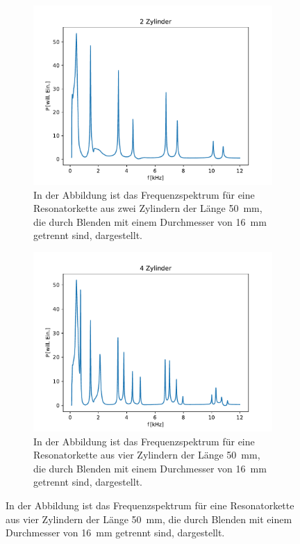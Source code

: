             \FloatBarrier
            \begin{figure}[ht]
                \centering
                \begin{subfigure}[b]{0.45\textwidth}
                    \centering
                    \includegraphics[scale=0.45]{./pictures/1dim_2_Zylinder_16mm.pdf}
                    \caption{In der Abbildung ist das Frequenzspektrum für eine Resonatorkette aus zwei Zylindern der Länge \SI{50}{\milli\metre}, die durch Blenden mit einem Durchmesser von \SI{16}{\milli\metre} getrennt sind, dargestellt.}
                    \label{fig:1dim_2_Zylinder_16mm}
                \end{subfigure}
                \hfill
                \centering
                \begin{subfigure}[b]{0.45\textwidth}
                    \centering
                    \includegraphics[scale=0.45]{./pictures/1dim_4_Zylinder_16mm.pdf}
                    \caption{In der Abbildung ist das Frequenzspektrum für eine Resonatorkette aus vier Zylindern der Länge \SI{50}{\milli\metre}, die durch Blenden mit einem Durchmesser von \SI{16}{\milli\metre} getrennt sind, dargestellt.}
                    \label{fig:1dim_4_Zylinder_16mm}
                \end{subfigure}


\end{figure}
